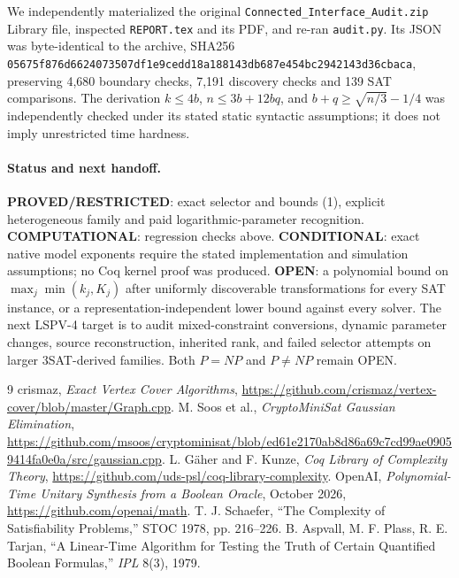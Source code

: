 \documentclass[11pt]{article}
\begin{document}
We independently materialized the original \texttt{Connected\_Interface\_Audit.zip} Library file, inspected \texttt{REPORT.tex} and its PDF, and re-ran \texttt{audit.py}. Its JSON was byte-identical to the archive, SHA256 \texttt{05675f876d6624073507df1e9cedd18a188143db687e454bc2942143d36cbaca}, preserving 4,680 boundary checks, 7,191 discovery checks and 139 SAT comparisons. The derivation $k\le4b$, $n\le3b+12bq$, and $b+q\ge\sqrt{n/3}-1/4$ was independently checked under its stated static syntactic assumptions; it does not imply unrestricted time hardness.

\paragraph{Status and next handoff.} \textbf{PROVED/RESTRICTED}: exact selector and bounds (1), explicit heterogeneous family and paid logarithmic-parameter recognition. \textbf{COMPUTATIONAL}: regression checks above. \textbf{CONDITIONAL}: exact native model exponents require the stated implementation and simulation assumptions; no Coq kernel proof was produced. \textbf{OPEN}: a polynomial bound on $\max_j\min(k_j,K_j)$ after uniformly discoverable transformations for every SAT instance, or a representation-independent lower bound against every solver. The next LSPV-4 target is to audit mixed-constraint conversions, dynamic parameter changes, source reconstruction, inherited rank, and failed selector attempts on larger 3SAT-derived families. Both $P=NP$ and $P\ne NP$ remain OPEN.

\begin{thebibliography}{9}
 crismaz, \emph{Exact Vertex Cover Algorithms}, \url{https://github.com/crismaz/vertex-cover/blob/master/Graph.cpp}.
 M. Soos et al., \emph{CryptoMiniSat Gaussian Elimination}, \url{https://github.com/msoos/cryptominisat/blob/ed61e2170ab8d86a69c7cd99ae09059414fa0e0a/src/gaussian.cpp}.
 L. G\"aher and F. Kunze, \emph{Coq Library of Complexity Theory}, \url{https://github.com/uds-psl/coq-library-complexity}.
 OpenAI, \emph{Polynomial-Time Unitary Synthesis from a Boolean Oracle}, October 2026, \url{https://github.com/openai/math}.
 T. J. Schaefer, ``The Complexity of Satisfiability Problems,'' STOC 1978, pp. 216--226.
 B. Aspvall, M. F. Plass, R. E. Tarjan, ``A Linear-Time Algorithm for Testing the Truth of Certain Quantified Boolean Formulas,'' \emph{IPL} 8(3), 1979.
\end{thebibliography}
\end{document}
